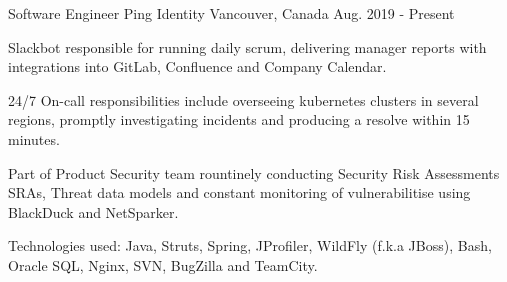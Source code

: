 

\begin{cventries}

  \cventry
    {Software Engineer} %
    {Ping Identity} %
    {Vancouver, Canada} %
    {Aug. 2019 - Present} %
    {
      \begin{cvitems} %
        \item {Slackbot responsible for running daily scrum, delivering manager reports with integrations into GitLab, Confluence and Company Calendar.}
        \item {24/7 On-call responsibilities include overseeing kubernetes clusters in several regions, promptly investigating incidents and producing a resolve within 15 minutes. }
        \item {Part of Product Security team rountinely conducting Security Risk Assessments SRAs, Threat data models and constant monitoring of vulnerabilitise using BlackDuck and NetSparker. }
        \item {Technologies used: Java, Struts, Spring, JProfiler, WildFly (f.k.a JBoss), Bash, Oracle SQL, Nginx, SVN, BugZilla and TeamCity. }
     \end{cvitems}
    }


\end{cventries}
